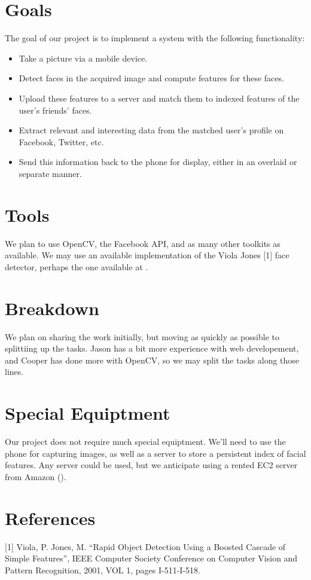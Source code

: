 \section{Goals}

The goal of our project is to implement a system with the following
functionality:

\begin{itemize}
\item Take a picture via a mobile device.
\item Detect faces in the acquired image and compute features for
  these faces.
\item Upload these features to a server and match them to indexed
  features of the user's friends' faces.
\item Extract relevant and interesting data from the matched user's
  profile on Facebook, Twitter, etc.
\item Send this information back to the phone for display, either in
  an overlaid or separate manner.
\end{itemize}



\section{Tools}

We plan to use OpenCV, the Facebook API, and as many other toolkits as
available.  We may use an available implementation of the Viola Jones
[1] face detector, perhaps the one available at
.



\section{Breakdown}

We plan on sharing the work initially, but moving as quickly as
possible to splittiing up the tasks.  Jason has a bit more experience
with web developement, and Cooper has done more with OpenCV, so we may
split the tasks along those lines.



\section{Special Equiptment}

Our project does not require much special equiptment.  We'll need to
use the phone for capturing images, as well as a server to store a
persistent index of facial features.  Any server could be used, but we
anticipate using a rented EC2 server from Amazon
().



\section{References}

[1] Viola, P. Jones, M.  ``Rapid Object Detection Using a Boosted
Cascade of Simple Features'', IEEE Computer Society Conference on
Computer Vision and Pattern Recognition, 2001, VOL 1, pages
I-511-I-518.
